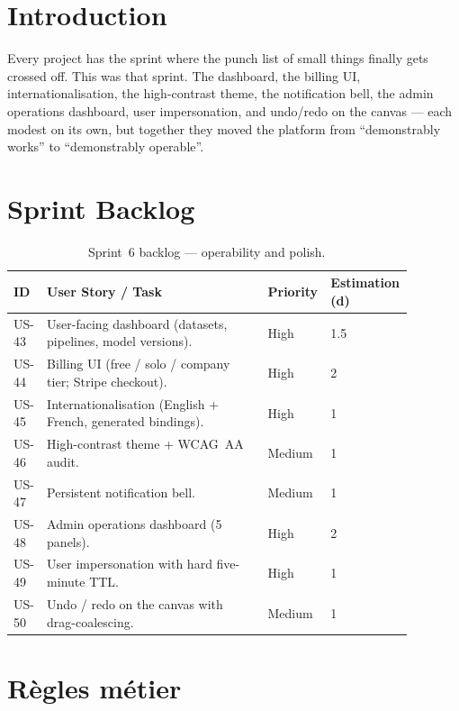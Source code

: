 \documentclass[12pt, a4paper, oneside]{report}
\begin{document}
\section*{Introduction}

Every project has the sprint where the punch list of small things
finally gets crossed off. This was that sprint. The dashboard, the
billing UI, internationalisation, the high-contrast theme, the
notification bell, the admin operations dashboard, user
impersonation, and undo/redo on the canvas --- each modest on its
own, but together they moved the platform from ``demonstrably
works'' to ``demonstrably operable''.

\section{Sprint Backlog}

\begin{table}[H]
\centering
\caption{Sprint~6 backlog --- operability and polish.}
\label{tab:sprint6_backlog}
\begin{tabular}{|p{0.05\linewidth}|L{0.55\linewidth}|p{0.1\linewidth}|p{0.18\linewidth}|}
\hline
\textbf{ID} & \textbf{User Story / Task} & \textbf{Priority} & \textbf{Estimation (d)} \\
\hline
US-43 & User-facing dashboard (datasets, pipelines, model versions). & High & 1.5 \\ \hline
US-44 & Billing UI (free / solo / company tier; Stripe checkout). & High & 2 \\ \hline
US-45 & Internationalisation (English + French, generated bindings). & High & 1 \\ \hline
US-46 & High-contrast theme + WCAG~AA audit. & Medium & 1 \\ \hline
US-47 & Persistent notification bell. & Medium & 1 \\ \hline
US-48 & Admin operations dashboard (5 panels). & High & 2 \\ \hline
US-49 & User impersonation with hard five-minute TTL. & High & 1 \\ \hline
US-50 & Undo / redo on the canvas with drag-coalescing. & Medium & 1 \\
\hline
\end{tabular}
\end{table}

\section{Règles métier}
\end{document}
